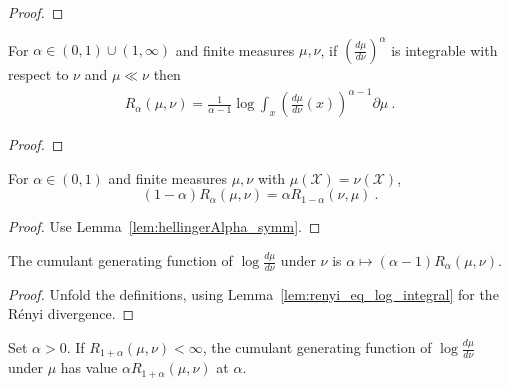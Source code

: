 \begin{proof}\leanok
{}
\end{proof}


\begin{lemma}
  \label{lem:renyi_eq_log_integral'}
  \leanok
  For $\alpha \in (0,1)\cup(1, \infty)$ and finite measures $\mu, \nu$, if 
  $\left(\frac{d \mu}{d \nu}\right)^\alpha$ is integrable with respect to $\nu$ and $\mu \ll \nu$ then
  \begin{align*}
  R_\alpha(\mu, \nu) = \frac{1}{\alpha - 1} \log \int_x \left(\frac{d \mu}{d \nu}(x)\right)^{\alpha - 1} \partial \mu
  \: .
  \end{align*}
\end{lemma}

\begin{proof}\leanok
{}
\end{proof}


\begin{lemma}
  \label{lem:renyi_symm}
  \leanok
  For $\alpha \in (0, 1)$ and finite measures $\mu, \nu$ with $\mu(\mathcal X) = \nu(\mathcal X)$, 
  \[(1 - \alpha) R_\alpha(\mu, \nu) = \alpha R_{1 - \alpha}(\nu, \mu) \: .\]
\end{lemma}

\begin{proof}\leanok
{}
Use Lemma~\ref{lem:hellingerAlpha_symm}.
\end{proof}


\begin{lemma}
  \label{lem:renyi_cgf}
  \leanok
  The cumulant generating function of $\log\frac{d\mu}{d\nu}$ under $\nu$ is $\alpha \mapsto (\alpha - 1) R_\alpha(\mu, \nu)$.
\end{lemma}

\begin{proof}\leanok
{}
Unfold the definitions, using Lemma~\ref{lem:renyi_eq_log_integral} for the Rényi divergence.
\end{proof}


\begin{lemma}
  \label{lem:renyi_cgf_2}
  \leanok
  Set $\alpha > 0$. If $R_{1+\alpha}(\mu, \nu) < \infty$, the cumulant generating function of $\log\frac{d\mu}{d\nu}$ under $\mu$ has value $\alpha R_{1+\alpha}(\mu, \nu)$ at $\alpha$.
\end{lemma}

